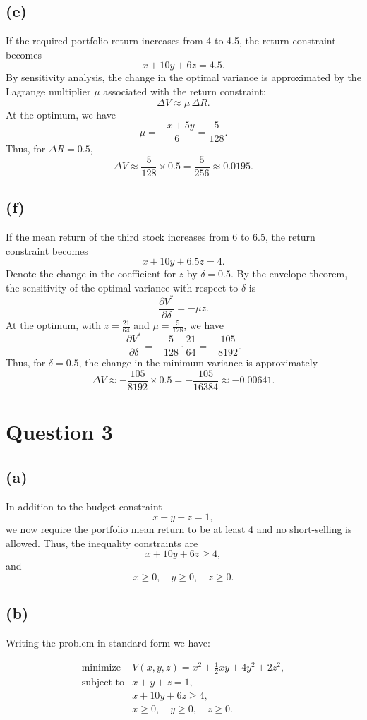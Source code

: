 \documentclass{article}
\begin{document}
\subsection*{(e)}
If the required portfolio return increases from 4 to 4.5, the return constraint becomes
\[
x+10y+6z=4.5.
\]
By sensitivity analysis, the change in the optimal variance is approximated by the Lagrange multiplier \(\mu\) associated with the return constraint:
\[
\Delta V\approx \mu\,\Delta R.
\]
At the optimum, we have
\[
\mu=\frac{-x+5y}{6}=\frac{5}{128}.
\]
Thus, for \(\Delta R=0.5\),
\[
\Delta V\approx \frac{5}{128}\times 0.5=\frac{5}{256}\approx 0.0195.
\]

\subsection*{(f)}
If the mean return of the third stock increases from 6 to 6.5, the return constraint becomes
\[
x+10y+6.5z=4.
\]
Denote the change in the coefficient for \(z\) by \(\delta=0.5\). By the envelope theorem, the sensitivity of the optimal variance with respect to \(\delta\) is
\[
\frac{\partial V^*}{\partial \delta}=-\mu z.
\]
At the optimum, with \(z=\frac{21}{64}\) and \(\mu=\frac{5}{128}\), we have
\[
\frac{\partial V^*}{\partial \delta}=-\frac{5}{128}\cdot\frac{21}{64}=-\frac{105}{8192}.
\]
Thus, for \(\delta=0.5\), the change in the minimum variance is approximately
\[
\Delta V\approx -\frac{105}{8192}\times 0.5=-\frac{105}{16384}\approx -0.00641.
\]

\section*{Question 3}

\subsection*{(a)}
In addition to the budget constraint 
\[
x+y+z=1,
\]
we now require the portfolio mean return to be at least 4 and no short-selling is allowed. Thus, the inequality constraints are
\[
x+10y+6z\ge 4,
\]
and
\[
x\ge 0,\quad y\ge 0,\quad z\ge 0.
\]

\subsection*{(b)}
Writing the problem in standard form we have:

\[
\begin{array}{rl}
\text{minimize} & V(x,y,z)=x^2+\frac{1}{2}xy+4y^2+2z^2,\\[1mm]
\text{subject to} & x+y+z=1,\\[1mm]
 & x+10y+6z\ge 4,\\[1mm]
 & x\ge 0,\quad y\ge 0,\quad z\ge 0.
\end{array}
\]
\end{document}
